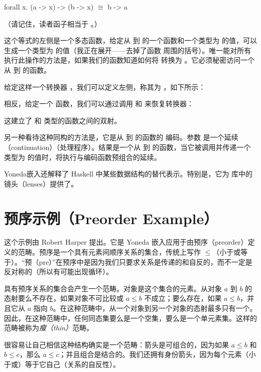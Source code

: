\begin{snipv}
  forall x. (a -> x) -> (b -> x) \ensuremath{\cong} b -> a
\end{snipv}
（请记住，读者函子相当于 。）

这个等式的左侧是一个多态函数，给定从  到  的一个函数和一个类型为  的值，可以生成一个类型为  的值（我正在展开——去掉了函数  周围的括号）。唯一能对所有  执行此操作的方法是，如果我们的函数知道如何将  转换为 。它必须秘密访问一个从  到  的函数。

给定这样一个转换器 ，我们可以定义左侧，称其为 ，如下所示：

相反，给定一个  函数，我们可以通过调用  和  来恢复转换器：

这建立了  和  类型的函数之间的双射。

另一种看待这种同构的方法是，它是从  到  的函数的 编码。参数  是一个延续（continuation）（处理程序）。结果是一个从  到  的函数，当它被调用并传递一个类型为  的值时，将执行与编码函数预组合的延续。

Yoneda嵌入还解释了 Haskell 中某些数据结构的替代表示。特别是，它为  库中的镜头（lenses）提供了。

\section{预序示例（Preorder Example）}

这个示例由 Robert Harper 提出。它是 Yoneda 嵌入应用于由预序（preorder）定义的范畴。预序是一个具有元素间顺序关系的集合，传统上写作 $\leqslant$（小于或等于）。“预（pre）”在预序中是因为我们只要求关系是传递的和自反的，而不一定是反对称的（所以有可能出现循环）。

具有预序关系的集合会产生一个范畴。对象是这个集合的元素。从对象 $a$ 到 $b$ 的态射要么不存在，如果对象不可比较或 $a \leqslant b$ 不成立；要么存在，如果 $a \leqslant b$，并且它从 $a$ 指向 $b$。在这种范畴中，从一个对象到另一个对象的态射最多只有一个。因此，在这种范畴中，任何同态集要么是一个空集，要么是一个单元素集。这样的范畴被称为\emph{瘦（thin）}范畴。

很容易让自己相信这种结构确实是一个范畴：箭头是可组合的，因为如果 $a \leqslant b$ 和 $b \leqslant c$，那么 $a \leqslant c$；并且组合是结合的。我们还拥有身份箭头，因为每个元素（小于或）等于它自己（关系的自反性）。

